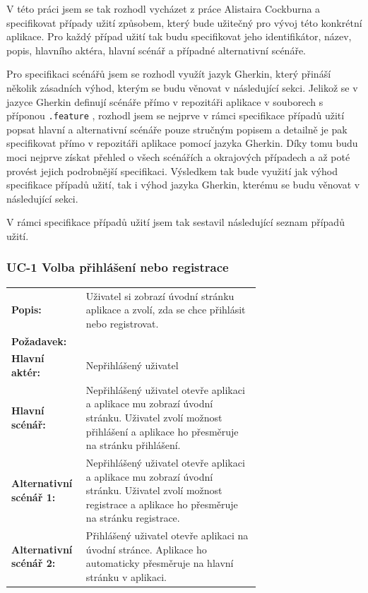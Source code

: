 V této práci jsem se tak rozhodl vycházet z práce Alistaira Cockburna \cite{Cockburn2001WritingEffectiveUseCases} a specifikovat případy užití způsobem, který bude užitečný pro vývoj této konkrétní aplikace. Pro každý případ užití tak budu specifikovat jeho identifikátor, název, popis, hlavního aktéra, hlavní scénář a případné alternativní scénáře. 

Pro specifikaci scénářů jsem se rozhodl využít jazyk Gherkin, který přináší několik zásadních výhod, kterým se budu věnovat v následující sekci. Jelikož se v jazyce Gherkin definují scénáře přímo v repozitáři aplikace v souborech s příponou \texttt{.feature} \cite{CucumberDocs}, rozhodl jsem se nejprve v rámci specifikace případů užití popsat hlavní a alternativní scénáře pouze stručným popisem a detailně je pak specifikovat přímo v repozitáři aplikace pomocí jazyka Gherkin. Díky tomu budu moci nejprve získat přehled o všech scénářích a okrajových případech a až poté provést jejich podrobnější specifikaci. Výsledkem tak bude využití jak výhod specifikace případů užití, tak i výhod jazyka Gherkin, kterému se budu věnovat v následující sekci.

V rámci specifikace případů užití jsem tak sestavil následující seznam případů užití.

\subsubsection{UC-1 Volba přihlášení nebo registrace}

\begin{tabular}{lp{0.7\linewidth}}
  \textbf{Popis:} & Uživatel si zobrazí úvodní stránku aplikace a zvolí, zda se chce přihlásit nebo registrovat. \\
  \textbf{Požadavek:} & \nameref{sec:fp-welcome-page} \\
  \textbf{Hlavní aktér:} & Nepřihlášený uživatel \\
  \textbf{Hlavní scénář:} & Nepřihlášený uživatel otevře aplikaci a aplikace mu zobrazí úvodní stránku. Uživatel zvolí možnost přihlášení a aplikace ho přesměruje na stránku přihlášení. \\
  \textbf{Alternativní scénář 1:} & Nepřihlášený uživatel otevře aplikaci a aplikace mu zobrazí úvodní stránku. Uživatel zvolí možnost registrace a aplikace ho přesměruje na stránku registrace. \\
  \textbf{Alternativní scénář 2:} & Přihlášený uživatel otevře aplikaci na úvodní stránce. Aplikace ho automaticky přesměruje na hlavní stránku v aplikaci. \\
\end{tabular}

